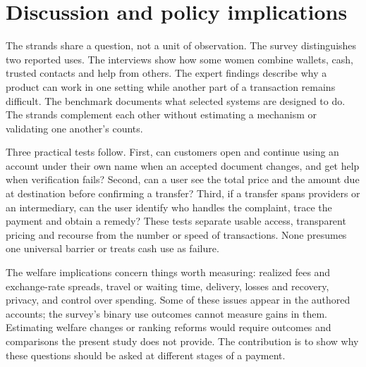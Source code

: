 \section{Discussion and policy implications}
The strands share a question, not a unit of observation. The survey distinguishes two reported uses. The interviews show how some women combine wallets, cash, trusted contacts and help from others. The expert findings describe why a product can work in one setting while another part of a transaction remains difficult. The benchmark documents what selected systems are designed to do. The strands complement each other without estimating a mechanism or validating one another's counts.

Three practical tests follow. First, can customers open and continue using an account under their own name when an accepted document changes, and get help when verification fails? Second, can a user see the total price and the amount due at destination before confirming a transfer? Third, if a transfer spans providers or an intermediary, can the user identify who handles the complaint, trace the payment and obtain a remedy? These tests separate usable access, transparent pricing and recourse from the number or speed of transactions. None presumes one universal barrier or treats cash use as failure.

The welfare implications concern things worth measuring: realized fees and exchange-rate spreads, travel or waiting time, delivery, losses and recovery, privacy, and control over spending. Some of these issues appear in the authored accounts; the survey's binary use outcomes cannot measure gains in them. Estimating welfare changes or ranking reforms would require outcomes and comparisons the present study does not provide. The contribution is to show why these questions should be asked at different stages of a payment.
